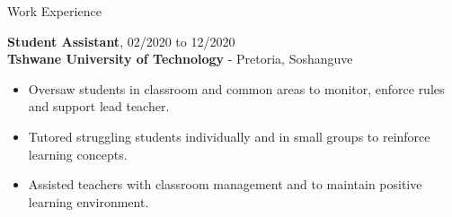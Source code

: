 \documentclass{resume} %
\newcommand{\sepspace}{\vspace*{1em}}           %
\begin{document}
\begin{rSection}{Work Experience}

        \textbf{Student Assistant}, 02/2020 to 12/2020 \\
        \textbf{Tshwane University of Technology} - Pretoria, Soshanguve
        \begin{itemize}[noitemsep,topsep=-6pt]
          \item  Oversaw students in classroom and common areas to monitor, enforce rules and support lead teacher.
          \item  Tutored struggling students individually and in small groups to reinforce learning concepts.
          \item  Assisted teachers with classroom management and to maintain positive learning environment. 
        \end{itemize}



\end{rSection}
\end{document}
